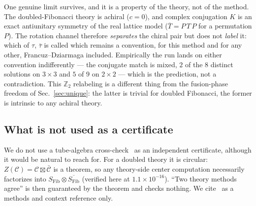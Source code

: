 \documentclass[aps,pra,twocolumn,superscriptaddress,longbibliography,floatfix,nofootinbib]{revtex4-2}
\begin{document}
One genuine limit survives, and it is a property of the theory, not of the
method. The doubled-Fibonacci theory is achiral ($c=0$), and complex
conjugation $K$ is an exact antiunitary symmetry of the real lattice model
($\overline{T}=P\,T\,P$ for a permutation $P$). The rotation channel therefore
\emph{separates} the chiral pair but does not \emph{label} it: which of $\tau$,
$\bar\tau$ is called which remains a convention, for this method and for any
other, Francuz--Dziarmaga included. Empirically the run lands on either
convention indifferently --- the conjugate match is mixed, $2$ of the $8$
distinct solutions on $3\times3$ and $5$ of $9$ on $2\times2$ --- which is the
prediction, not a contradiction. This $\mathbb{Z}_2$ relabeling is a different
thing from the fusion-phase freedom of Sec.~\ref{sec:unique}: the latter is
trivial for doubled Fibonacci, the former is intrinsic to any achiral theory.

\subsection{What is not used as a certificate}
\label{sec:tube}

We do not use a tube-algebra cross-check~\cite{Bultinck2017} as an independent
certificate, although it would be natural to reach for. For a doubled theory it
is circular: $Z(\mathcal{C})=\mathcal{C}\boxtimes\bar{\mathcal{C}}$ is a
theorem, so any theory-side center computation necessarily factorizes into
$S_{\mathrm{Fib}}\otimes\overline{S_{\mathrm{Fib}}}$ (verified here at
$1.1\times10^{-16}$). ``Two theory methods agree'' is then guaranteed by the
theorem and checks nothing. We cite~\cite{Bultinck2017} as a
methods and context reference only.
\end{document}
